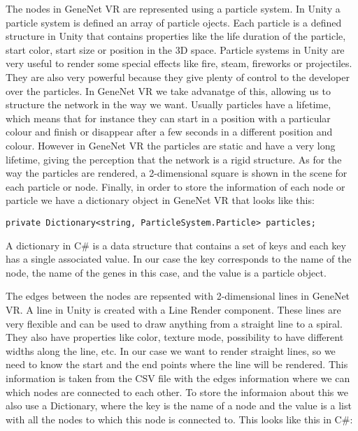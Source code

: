 The nodes in GeneNet VR are represented using a particle system. In Unity a particle system\cite{particle_system} is defined an array of particle ojects. Each particle is a defined structure in Unity that contains properties like the life duration of the particle, start color, start size or position in the 3D space. Particle systems in Unity are very useful to render some special effects like fire, steam, fireworks or projectiles. They are also very powerful because they give plenty of control to the developer over the particles. In GeneNet VR we take advanatge of this, allowing us to structure the network in the way we want. Usually particles have a lifetime, which means that for instance they can start in a position with a particular colour and finish or disappear after a few seconds in a different position and colour. However in GeneNet VR the particles are static and have a very long lifetime, giving the perception that the network is a rigid structure. As for the way the particles are rendered, a 2-dimensional square is shown in the scene for each particle or node. Finally, in order to store the information of each node or particle we have a dictionary object in GeneNet VR that looks like this:

\begin{verbatim}
private Dictionary<string, ParticleSystem.Particle> particles;
\end{verbatim}

A dictionary in C\# is a data structure that contains a set of keys and each key has a single associated value. In our case the key corresponds to the name of the node, the name of the genes in this case, and the value is a particle object.

The edges between the nodes are repsented with 2-dimensional lines in GeneNet VR. A line in Unity is created with a Line Render component\cite{line_render}. These lines are very flexible and can be used to draw anything from a straight line to a spiral. They also have properties like color, texture mode, possibility to have different widths along the line, etc. In our case we want to render straight lines, so we need to know the start and the end points where the line will be rendered. This information is taken from the CSV file with the edges information where we can which nodes are connected to each other. To store the informaion about this we also use a Dictionary, where the key is the name of a node and the value is a list with all the nodes to which this node is connected to. This looks like this in C\#:

